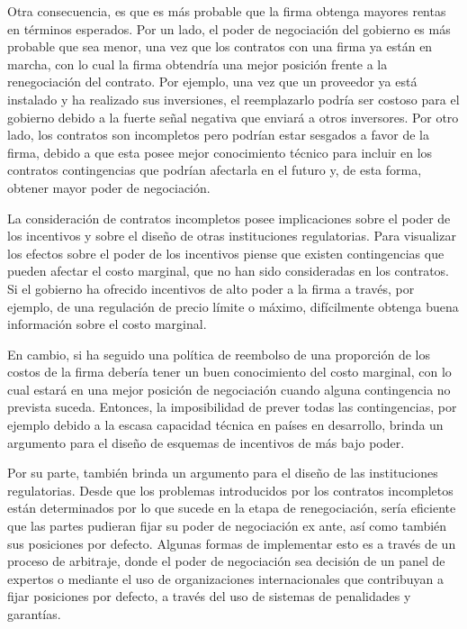 \documentclass[
  12pt,
  spanish,
]{book}
\begin{document}
Otra consecuencia, es que es más probable que la firma obtenga mayores rentas en términos esperados. Por un lado, el poder de negociación del gobierno es más probable que sea menor, una vez que los contratos con una firma ya están en marcha, con lo cual la firma obtendría una mejor posición frente a la renegociación del contrato. Por ejemplo, una vez que un proveedor ya está instalado y ha realizado sus inversiones, el
reemplazarlo podría ser costoso para el gobierno debido a la fuerte señal negativa que enviará a otros inversores. Por otro lado, los contratos son incompletos pero podrían estar sesgados a favor de la firma, debido a que esta posee mejor conocimiento técnico para incluir en los contratos contingencias que podrían afectarla en el futuro y, de esta forma, obtener mayor poder de negociación.

La consideración de contratos incompletos posee implicaciones sobre el poder de los incentivos y sobre el diseño de otras instituciones regulatorias. Para visualizar los efectos sobre el poder de los incentivos piense que existen contingencias que pueden afectar el costo marginal, que no han sido consideradas en los contratos. Si el gobierno ha ofrecido incentivos de alto poder a la firma a través, por ejemplo, de una regulación de precio límite o máximo, difícilmente obtenga buena información sobre el costo marginal.

En cambio, si ha seguido una política de reembolso de una proporción de los costos de la firma debería tener un buen conocimiento del costo marginal, con lo cual estará en una mejor posición de negociación cuando alguna contingencia no prevista suceda. Entonces, la imposibilidad de prever todas las contingencias, por ejemplo debido a la escasa capacidad técnica en países en desarrollo, brinda un argumento para el diseño de esquemas de incentivos de más bajo poder.

Por su parte, también brinda un argumento para el diseño de las instituciones regulatorias. Desde que los problemas introducidos por los contratos incompletos están determinados por lo que sucede en la etapa de renegociación, sería eficiente que las partes pudieran fijar su poder de negociación ex ante, así como también sus posiciones por defecto. Algunas formas de implementar esto es a través de un proceso de arbitraje, donde el poder de negociación sea decisión de un panel de expertos o mediante el uso de organizaciones internacionales que contribuyan a fijar posiciones por defecto, a través del uso de sistemas de penalidades y garantías.
\end{document}
